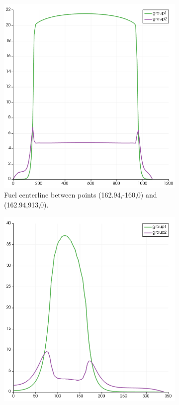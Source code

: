 \documentclass[11pt,letterpaper]{article}
\begin{document}
	\begin{figure}[htbp!]
		\centering
		\begin{subfigure}[t]{0.4\textwidth}
			\centering
			\includegraphics[width=\linewidth]{2D-fullcore-reflec-action1}
			\caption{Fuel centerline between points (162.94,-160,0) and (162.94,913,0).}
		\end{subfigure}
		\begin{subfigure}[t]{0.4\textwidth}
			\centering
			\includegraphics[width=\linewidth]{2D-fullcore-reflec-action2}

\end{subfigure}
\end{figure}
\end{document}

